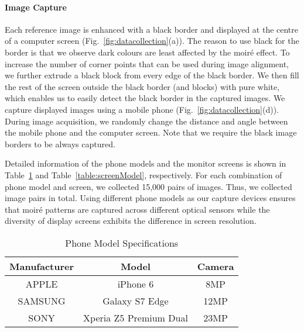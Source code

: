 \documentclass[journal]{IEEEtran}
\begin{document}
\paragraph{Image Capture}
Each reference image is enhanced with a black border and displayed at the centre of a computer screen (Fig.~\ref{fig:datacollection}(a)).
The reason to use black for the border is that we observe dark colours are least affected by the moir\'{e} effect. To increase the number of corner points that can be used during image alignment, we further extrude a black block from every edge of the black border. We then fill the rest of the screen outside the black border (and blocks) with pure white, which enables us to easily detect the black border in the captured images. We capture displayed images using a mobile phone (Fig.~\ref{fig:datacollection}(d)). During image acquisition, we randomly change the distance and angle between the mobile phone and the computer screen. Note that we require the black image borders to be always captured.

Detailed information of the phone models and the monitor screens is shown in Table~\ref{table:phoneModel} and Table~\ref{table:screenModel}, respectively. For each combination of phone model and screen, we collected 15,000 pairs of images. Thus, we collected  image pairs in total. Using different phone models as our capture devices ensures that moir\'{e} patterns are captured across different optical sensors while the diversity of display screens exhibits the difference in screen resolution.


\begin{table}[b]
\centering
\caption{Phone Model Specifications}
\label{table:phoneModel}
\begin{tabular}{|c|c|c|}
\midrule
\textbf{Manufacturer} & \textbf{Model}         & \textbf{Camera} \\ \midrule
APPLE                 & iPhone 6               & 8MP             \\ \midrule
SAMSUNG               & Galaxy S7 Edge         & 12MP            \\ \midrule
SONY                  & Xperia Z5 Premium Dual & 23MP            \\
\midrule
\end{tabular}
\end{table}


\begin{table}[b]
\centering
\caption{Display Screen Specifications}
\label{table:screenModel}
\end{table}
\end{document}

